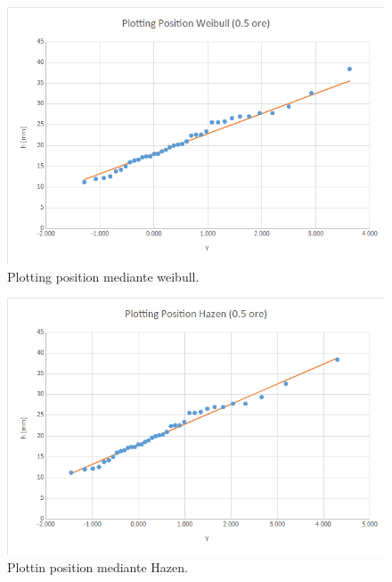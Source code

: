     \begin{figure}[H]\centering
        \includegraphics[scale=.5]{immagini/plot_pos_weib_05ore.png}
        \caption{Plotting position mediante weibull.}
      \label{plot_pos_weib_05ore}
    \end{figure}

    \begin{figure}[H]\centering
        \includegraphics[scale=.5]{immagini/plot_pos_hazen_05ore.png}
        \caption{Plottin position mediante Hazen.}
      \label{plot_pos_hazen_05ore}
    \end{figure}

